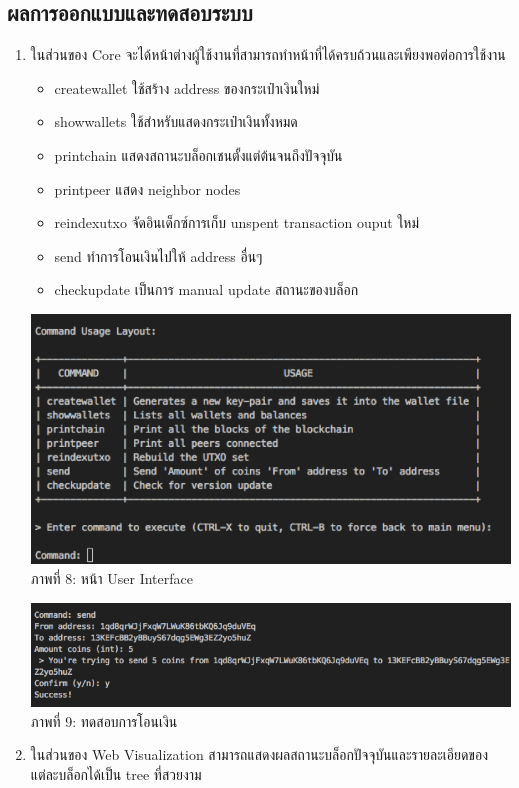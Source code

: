 \documentclass[letterpaper, 10pt, conference]{ieeeconf}
\begin{document}
\subsection{ผลการออกแบบและทดสอบระบบ}
	\begin{enumerate}
		\item ในส่วนของ Core จะได้หน้าต่างผู้ใช้งานที่สามารถทำหน้าที่ได้ครบถ้วนและเพียงพอต่อการใช้งาน
		\begin{itemize}
			\item createwallet ใช้สร้าง address ของกระเป๋าเงินใหม่
			\item showwallets ใช้สำหรับแสดงกระเป๋าเงินทั้งหมด
			\item printchain แสดงสถานะบล็อกเชนตั้งแต่ต้นจนถึงปัจจุบัน
			\item printpeer แสดง neighbor nodes
			\item reindexutxo จัดอินเด็กซ์การเก็บ unspent transaction ouput ใหม่
			\item send ทำการโอนเงินไปให้ address อื่นๆ
			\item checkupdate เป็นการ manual update สถานะของบล็อก
		\end{itemize}
		\medskip
		{\centering
			\includegraphics[scale=0.7]{result-1} \\
			ภาพที่ 8: หน้า User Interface \par
		}
		\medskip
		{\centering
			\includegraphics[scale=0.525]{result-2} \\
			ภาพที่ 9: ทดสอบการโอนเงิน \par
		}
		\medskip
		\item ในส่วนของ Web Visualization สามารถแสดงผลสถานะบล็อกปัจจุบันและรายละเอียดของแต่ละบล็อกได้เป็น tree ที่สวยงาม \\


\end{enumerate}
\end{document}
